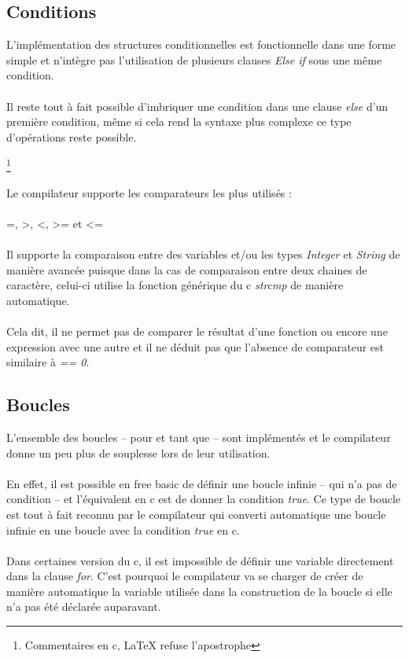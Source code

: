 \documentclass{article}
\begin{document}
\subsection{Conditions}
L'implémentation des structures conditionnelles est fonctionnelle dans une forme simple et n'intègre pas
l'utilisation de plusieurs clauses \emph{Else if} sous une même condition.
\\\\
Il reste tout à fait possible d'imbriquer une condition dans une clause \emph{else} d'un première condition,
même si cela rend la syntaxe plus complexe ce type d'opérations reste possible.

\lstset{language=c,caption=Raccourci de syntaxe pour les conditions}
\footnote{Commentaires en c, LaTeX refuse l'apostrophe}

Le compilateur supporte les comparateurs les plus utilisés : 	
\\\\
=, >, <, >= et <=
\\\\
Il supporte la comparaison entre 
des variables et/ou les types \emph{Integer} et \emph{String} de manière avancée puisque dans la cas de comparaison
entre deux chaines de caractère, celui-ci utilise la fonction générique du c \emph{strcmp} de manière automatique.
\\\\
Cela dit, il ne permet pas de comparer le résultat d'une fonction ou encore une expression avec une autre et il 
ne déduit pas que l'absence de comparateur est similaire à \emph{== 0}.
\subsection{Boucles}
L'ensemble des boucles -- pour et tant que -- sont implémentés et le compilateur donne un peu plus 
de souplesse lors de leur utilisation.
\\\\
En effet, il est possible en free basic de définir une boucle infinie -- qui n'a pas de condition -- et 
l'équivalent en c est de donner la condition \emph{true}. Ce type de boucle est tout à fait reconnu par le 
compilateur qui converti automatique une boucle infinie en une boucle avec la condition \emph{true} en c.
\\\\
Dans certaines version du c, il est impossible de définir une variable directement dans la clause \emph{for}.
C'est pourquoi le compilateur va se charger de créer de manière automatique la variable utilisée dans 
la construction de la boucle si elle n'a pas été déclarée auparavant.
\end{document}
